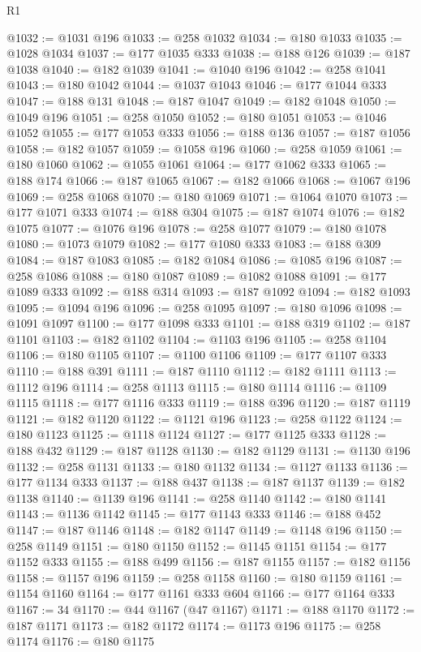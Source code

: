 \begin{lexlean}{R1}
\begin{coremodule}
@1032 := @1031 @196
@1033 := @258 @1032
@1034 := @180 @1033
@1035 := @1028 @1034
@1037 := @177 @1035 @333
@1038 := @188 @126
@1039 := @187 @1038
@1040 := @182 @1039
@1041 := @1040 @196
@1042 := @258 @1041
@1043 := @180 @1042
@1044 := @1037 @1043
@1046 := @177 @1044 @333
@1047 := @188 @131
@1048 := @187 @1047
@1049 := @182 @1048
@1050 := @1049 @196
@1051 := @258 @1050
@1052 := @180 @1051
@1053 := @1046 @1052
@1055 := @177 @1053 @333
@1056 := @188 @136
@1057 := @187 @1056
@1058 := @182 @1057
@1059 := @1058 @196
@1060 := @258 @1059
@1061 := @180 @1060
@1062 := @1055 @1061
@1064 := @177 @1062 @333
@1065 := @188 @174
@1066 := @187 @1065
@1067 := @182 @1066
@1068 := @1067 @196
@1069 := @258 @1068
@1070 := @180 @1069
@1071 := @1064 @1070
@1073 := @177 @1071 @333
@1074 := @188 @304
@1075 := @187 @1074
@1076 := @182 @1075
@1077 := @1076 @196
@1078 := @258 @1077
@1079 := @180 @1078
@1080 := @1073 @1079
@1082 := @177 @1080 @333
@1083 := @188 @309
@1084 := @187 @1083
@1085 := @182 @1084
@1086 := @1085 @196
@1087 := @258 @1086
@1088 := @180 @1087
@1089 := @1082 @1088
@1091 := @177 @1089 @333
@1092 := @188 @314
@1093 := @187 @1092
@1094 := @182 @1093
@1095 := @1094 @196
@1096 := @258 @1095
@1097 := @180 @1096
@1098 := @1091 @1097
@1100 := @177 @1098 @333
@1101 := @188 @319
@1102 := @187 @1101
@1103 := @182 @1102
@1104 := @1103 @196
@1105 := @258 @1104
@1106 := @180 @1105
@1107 := @1100 @1106
@1109 := @177 @1107 @333
@1110 := @188 @391
@1111 := @187 @1110
@1112 := @182 @1111
@1113 := @1112 @196
@1114 := @258 @1113
@1115 := @180 @1114
@1116 := @1109 @1115
@1118 := @177 @1116 @333
@1119 := @188 @396
@1120 := @187 @1119
@1121 := @182 @1120
@1122 := @1121 @196
@1123 := @258 @1122
@1124 := @180 @1123
@1125 := @1118 @1124
@1127 := @177 @1125 @333
@1128 := @188 @432
@1129 := @187 @1128
@1130 := @182 @1129
@1131 := @1130 @196
@1132 := @258 @1131
@1133 := @180 @1132
@1134 := @1127 @1133
@1136 := @177 @1134 @333
@1137 := @188 @437
@1138 := @187 @1137
@1139 := @182 @1138
@1140 := @1139 @196
@1141 := @258 @1140
@1142 := @180 @1141
@1143 := @1136 @1142
@1145 := @177 @1143 @333
@1146 := @188 @452
@1147 := @187 @1146
@1148 := @182 @1147
@1149 := @1148 @196
@1150 := @258 @1149
@1151 := @180 @1150
@1152 := @1145 @1151
@1154 := @177 @1152 @333
@1155 := @188 @499
@1156 := @187 @1155
@1157 := @182 @1156
@1158 := @1157 @196
@1159 := @258 @1158
@1160 := @180 @1159
@1161 := @1154 @1160
@1164 := @177 @1161 @333 @604
@1166 := @177 @1164 @333
@1167 := 34
@1170 := @44 @1167 (@47 @1167)
@1171 := @188 @1170
@1172 := @187 @1171
@1173 := @182 @1172
@1174 := @1173 @196
@1175 := @258 @1174
@1176 := @180 @1175

\end{coremodule}
\end{lexlean}

